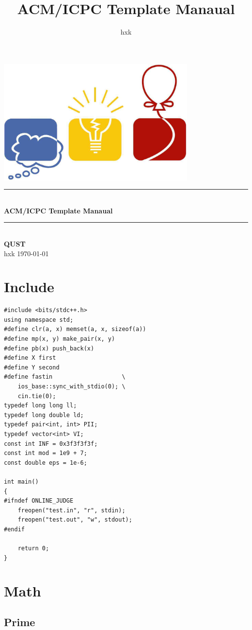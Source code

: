 \documentclass[twoside]{article}
\title{ACM/ICPC Template Manaual}
\author{hxk}
\newcommand{\HRule}{\rule{\linewidth}{0.5mm}}
\begin{document}
\small
\begin{titlepage}
\begin{center}
\vspace*{0.5cm}\includegraphics[width=0.75\textwidth]{logo.jpg} \\ [2cm]
\HRule \\ [1cm]
\textbf{\Huge{ACM/ICPC Template Manaual}} \\ [0.5cm]
\HRule \\ [4cm]
\textbf{\Huge{QUST}} \\ [1cm]
\LARGE{hxk}
\vfill
\Large{\today}
\end{center}
\clearpage
\end{titlepage}
\tableofcontents\clearpage
\pagestyle{fancy}
\lfoot{}
\cfoot{\thepage}\rfoot{}
\setcounter{section}{-1}
\setcounter{page}{1}
\clearpage\section{Include}
\begin{lstlisting}
#include <bits/stdc++.h>
using namespace std;
#define clr(a, x) memset(a, x, sizeof(a))
#define mp(x, y) make_pair(x, y)
#define pb(x) push_back(x)
#define X first
#define Y second
#define fastin                    \
    ios_base::sync_with_stdio(0); \
    cin.tie(0);
typedef long long ll;
typedef long double ld;
typedef pair<int, int> PII;
typedef vector<int> VI;
const int INF = 0x3f3f3f3f;
const int mod = 1e9 + 7;
const double eps = 1e-6;

int main()
{
#ifndef ONLINE_JUDGE
    freopen("test.in", "r", stdin);
    freopen("test.out", "w", stdout);
#endif
    
    return 0;
}
\end{lstlisting}
\clearpage\section{Math}
\subsection{Prime}
\end{document}
